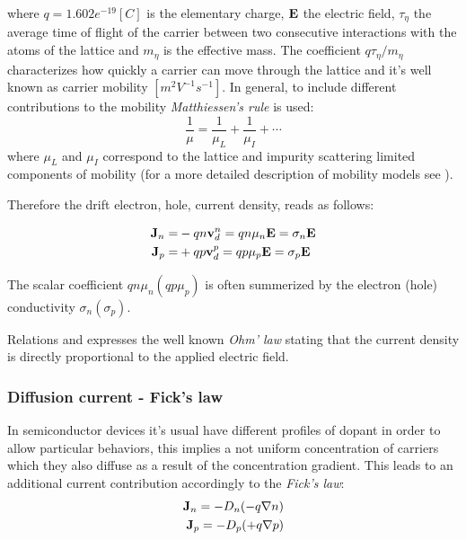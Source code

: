 where $q=1.602e^{-19}[C]$ is the elementary charge, $\mathbf{E}$ the electric field, $\tau_\eta$ the average time of flight of the carrier between two consecutive interactions with the atoms of the lattice and $m_\eta$ is the effective mass.
The coefficient $q\tau_\eta / m_\eta$ characterizes how quickly a carrier can move through the lattice and it's well known as carrier mobility $[m^2V^{-1}s^{-1}]$.
In general, to include different contributions to the mobility \textit{Matthiessen's rule} is used:
\begin{equation}
\dfrac{1}{\mu} = \dfrac{1}{\mu_L} + \dfrac{1}{\mu_I} + \cdots
\end{equation}
where $\mu_L$ and $\mu_I$ correspond to the lattice and impurity scattering limited components of mobility (for a more detailed description of mobility models see \cite{ModernVLSIdevices}). 

Therefore the drift electron, hole, current density, reads as follows:

\begin{align}
\mathbf{J}_n =& -qn\mathbf{v}_d^n = qn\mu_n\mathbf{E}   = \sigma_n\mathbf{E} \label{eq: drift electron} \\ 
\mathbf{J}_p =& +qp\mathbf{v}_d^p = qp\mu_p\mathbf{E} = \sigma_p\mathbf{E} \label{eq: drift hole}
\end{align}

The scalar coefficient $qn\mu_n(qp\mu_p)$ is often summerized by the electron (hole) conductivity $\sigma_n(\sigma_p)$. 

Relations  and  expresses the well known \textit{Ohm' law} stating that the current density is directly proportional to the applied electric field.


\subsubsection{Diffusion current - Fick's law}

In semiconductor devices it's usual have different profiles of dopant in order to allow particular behaviors, this implies a not uniform concentration of carriers which they also diffuse as a result of the concentration gradient. This leads to an additional current contribution accordingly to the \textit{Fick's law}:
\begin{align}
\mathbf{J}_n = -D_n(-q\nabla n) \label{eq: diff electron}\\
\mathbf{J}_p = -D_p(+q\nabla p) \label{eq: diff hole}
\end{align}

